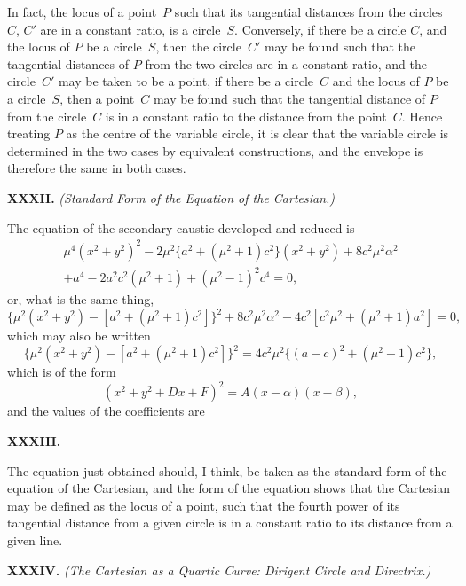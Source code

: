 \documentclass[11pt,a4paper]{book}
\begin{document}
\begin{center}
In fact, the locus of a point~$P$ such that its tangential distances
from the circles $C$, $C'$ are in a constant ratio, is a circle~$S$.
Conversely, if there be a circle $C$, and the locus of $P$ be a
circle~$S$, then the circle~$C'$ may be found such that the tangential
distances of $P$ from the two circles are in a constant ratio,
and the circle~$C'$ may be taken to be a point, \ie{} if there be
a circle~$C$ and the locus of $P$ be a circle~$S$, then a point~$C$
may be found such that the tangential distance of $P$ from the
circle~$C$ is in a constant ratio to the distance from the point~$C$.
Hence treating $P$ as the centre of the variable circle, it is clear
that the variable circle is determined in the two cases by
equivalent constructions, and the envelope is therefore the same
in both cases.

\medskip\noindent\textbf{XXXII.}
\textit{(Standard Form of the Equation of the Cartesian.)}

The equation of the secondary caustic developed and reduced is
\begin{multline*}
\mu^{4} (x^{2} + y^{2})^{2}
- 2\mu^{2} \{ a^{2} + (\mu^{2} + 1)c^{2} \} (x^{2} + y^{2})
+ 8c^{2}\mu^{2}\alpha^{2} \\
+ a^{4} - 2a^{2}c^{2}(\mu^{2} + 1) + (\mu^{2} - 1)^{2} c^{4} = 0,
\end{multline*}
or, what is the same thing,
\[
\{ \mu^{2} (x^{2} + y^{2}) - [a^{2} + (\mu^{2} + 1)c^{2}] \}^{2}
+ 8c^{2}\mu^{2}\alpha^{2} - 4c^{2} [ c^{2}\mu^{2} + (\mu^{2} + 1) a^{2} ] = 0,
\]
which may also be written
\[
\{ \mu^{2} (x^{2} + y^{2}) - [a^{2} + (\mu^{2} + 1)c^{2}] \}^{2}
= 4c^{2}\mu^{2} \{ (a - c)^{2} + (\mu^{2} - 1)c^{2} \},
\]
which is of the form
\[
(x^{2} + y^{2} + Dx + F)^{2} = A(x - \alpha)(x - \beta),
\]
and the values of the coefficients are

\medskip\noindent\textbf{XXXIII.}

The equation just obtained should, I think, be taken as the
standard form of the equation of the Cartesian, and the form
of the equation shows that the Cartesian may be defined as
the locus of a point, such that the fourth power of its tangential
distance from a given circle is in a constant ratio to its distance
from a given line.

\medskip\noindent\textbf{XXXIV.}
\textit{(The Cartesian as a Quartic Curve: Dirigent Circle and Directrix.)}


\end{center}
\end{document}
